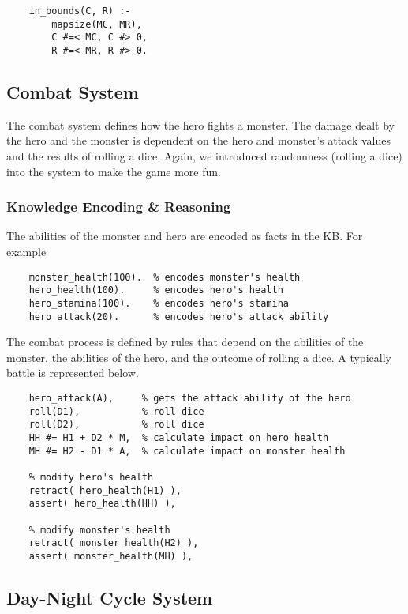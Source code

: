 \documentclass[10pt]{article}
\begin{document}
\begin{verbatim}
    in_bounds(C, R) :-
        mapsize(MC, MR),
        C #=< MC, C #> 0,
        R #=< MR, R #> 0.
\end{verbatim}


\subsection{Combat System}

The combat system defines how the hero fights a monster. The damage dealt by the hero and the monster is dependent on the hero and monster’s attack values and the results of rolling a dice. Again, we introduced randomness (rolling a dice) into the system to make the game more fun.

\subsubsection*{Knowledge Encoding \& Reasoning}

The abilities of the monster and hero are encoded as facts in the KB. For example

\begin{verbatim}
    monster_health(100).  % encodes monster's health
    hero_health(100).     % encodes hero's health
    hero_stamina(100).    % encodes hero's stamina
    hero_attack(20).      % encodes hero's attack ability
\end{verbatim}

The combat process is defined by rules that depend on the abilities of the monster, the abilities of the hero, and the outcome of rolling a dice. A typically battle is represented below.

\begin{verbatim}
    hero_attack(A),     % gets the attack ability of the hero
    roll(D1),           % roll dice
    roll(D2),           % roll dice
    HH #= H1 + D2 * M,  % calculate impact on hero health
    MH #= H2 - D1 * A,  % calculate impact on monster health
    
    % modify hero's health
    retract( hero_health(H1) ),
    assert( hero_health(HH) ),
    
    % modify monster's health
    retract( monster_health(H2) ),
    assert( monster_health(MH) ),
\end{verbatim}


\subsection{Day-Night Cycle System}
\end{document}
